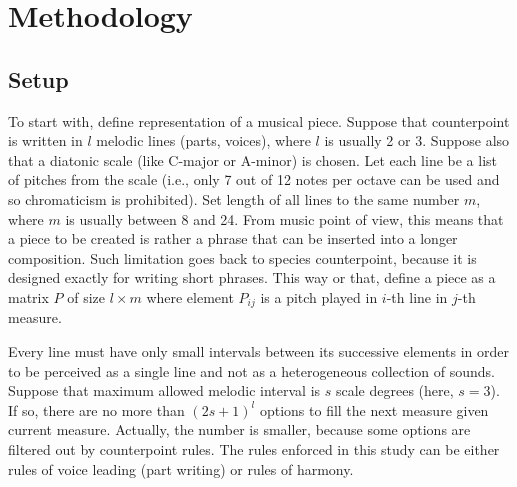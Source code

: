 \documentclass{article}
\begin{document}
\section{Methodology}
\label{sec:methodology}

\subsection{Setup}
\label{subsec:setup}

To start with, define representation of a musical piece. Suppose that counterpoint is written in $l$ melodic lines (parts, voices), where $l$ is usually 2 or 3. Suppose also that a diatonic scale (like C-major or A-minor) is chosen. Let each line be a list of pitches from the scale (i.e., only 7 out of 12 notes per octave can be used and so chromaticism is prohibited). Set length of all lines to the same number $m$, where $m$ is usually between 8 and 24. From music point of view, this means that a piece to be created is rather a phrase that can be inserted into a longer composition. Such limitation goes back to species counterpoint, because it is designed exactly for writing short phrases. This way or that, define a piece as a matrix $P$ of size $l \times m$ where element $P_{ij}$ is a pitch played in $i$-th line in $j$-th measure.

Every line must have only small intervals between its successive elements in order to be perceived as a single line and not as a heterogeneous collection of sounds. Suppose that maximum allowed melodic interval is $s$ scale degrees (here, $s = 3$). If so, there are no more than $(2s + 1)^l$ options to fill the next measure given current measure. Actually, the number is smaller, because some options are filtered out by counterpoint rules. The rules enforced in this study can be either rules of voice leading (part writing) or rules of harmony.
\end{document}
